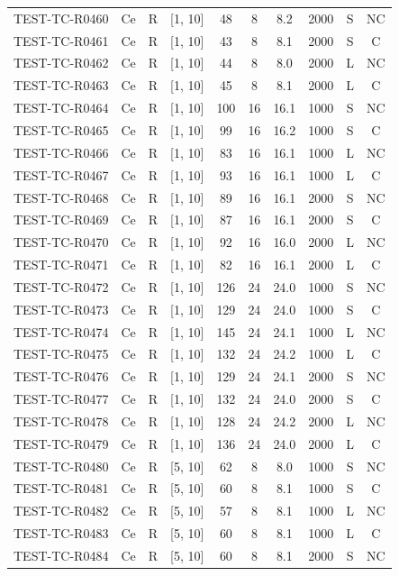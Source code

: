 \begin{longtable}{lccccccccc}
TEST-TC-R0460 & Ce & R & [1, 10] & 48 & 8 & 8.2 & 2000 & S & NC \\
TEST-TC-R0461 & Ce & R & [1, 10] & 43 & 8 & 8.1 & 2000 & S & C \\
TEST-TC-R0462 & Ce & R & [1, 10] & 44 & 8 & 8.0 & 2000 & L & NC \\
TEST-TC-R0463 & Ce & R & [1, 10] & 45 & 8 & 8.1 & 2000 & L & C \\
TEST-TC-R0464 & Ce & R & [1, 10] & 100 & 16 & 16.1 & 1000 & S & NC \\
TEST-TC-R0465 & Ce & R & [1, 10] & 99 & 16 & 16.2 & 1000 & S & C \\
TEST-TC-R0466 & Ce & R & [1, 10] & 83 & 16 & 16.1 & 1000 & L & NC \\
TEST-TC-R0467 & Ce & R & [1, 10] & 93 & 16 & 16.1 & 1000 & L & C \\
TEST-TC-R0468 & Ce & R & [1, 10] & 89 & 16 & 16.1 & 2000 & S & NC \\
TEST-TC-R0469 & Ce & R & [1, 10] & 87 & 16 & 16.1 & 2000 & S & C \\
TEST-TC-R0470 & Ce & R & [1, 10] & 92 & 16 & 16.0 & 2000 & L & NC \\
TEST-TC-R0471 & Ce & R & [1, 10] & 82 & 16 & 16.1 & 2000 & L & C \\
TEST-TC-R0472 & Ce & R & [1, 10] & 126 & 24 & 24.0 & 1000 & S & NC \\
TEST-TC-R0473 & Ce & R & [1, 10] & 129 & 24 & 24.0 & 1000 & S & C \\
TEST-TC-R0474 & Ce & R & [1, 10] & 145 & 24 & 24.1 & 1000 & L & NC \\
TEST-TC-R0475 & Ce & R & [1, 10] & 132 & 24 & 24.2 & 1000 & L & C \\
TEST-TC-R0476 & Ce & R & [1, 10] & 129 & 24 & 24.1 & 2000 & S & NC \\
TEST-TC-R0477 & Ce & R & [1, 10] & 132 & 24 & 24.0 & 2000 & S & C \\
TEST-TC-R0478 & Ce & R & [1, 10] & 128 & 24 & 24.2 & 2000 & L & NC \\
TEST-TC-R0479 & Ce & R & [1, 10] & 136 & 24 & 24.0 & 2000 & L & C \\
TEST-TC-R0480 & Ce & R & [5, 10] & 62 & 8 & 8.0 & 1000 & S & NC \\
TEST-TC-R0481 & Ce & R & [5, 10] & 60 & 8 & 8.1 & 1000 & S & C \\
TEST-TC-R0482 & Ce & R & [5, 10] & 57 & 8 & 8.1 & 1000 & L & NC \\
TEST-TC-R0483 & Ce & R & [5, 10] & 60 & 8 & 8.1 & 1000 & L & C \\
TEST-TC-R0484 & Ce & R & [5, 10] & 60 & 8 & 8.1 & 2000 & S & NC \\

\end{longtable}
